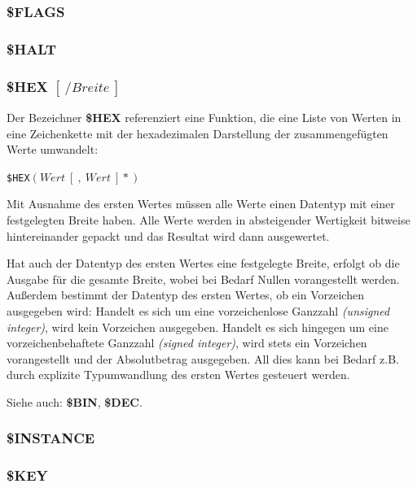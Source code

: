 \documentclass{scrartcl}
\begin{document}
\subsubsection{\$FLAGS}

\subsubsection{\$HALT}

\subsubsection{\$HEX $[~/Breite~]$}

\noindent Der Bezeichner \textbf{\$HEX} referenziert eine Funktion, die eine Liste von Werten in eine Zeichenkette mit der hexadezimalen Darstellung der zusammengefügten Werte umwandelt:

\vspace{10pt}
\texttt{\$HEX$(Wert~[~,~Wert~]*)$}

\vspace{10pt}
\noindent Mit Ausnahme des ersten Wertes müssen alle Werte einen Datentyp mit einer festgelegten Breite haben. Alle Werte werden in absteigender Wertigkeit bitweise hintereinander gepackt und das Resultat wird dann ausgewertet.

\vspace{10pt}
\noindent Hat auch der Datentyp des ersten Wertes eine festgelegte Breite, erfolgt ob die Ausgabe für die gesamte Breite, wobei bei Bedarf Nullen vorangestellt werden. Außerdem bestimmt der Datentyp des ersten Wertes, ob ein Vorzeichen ausgegeben wird: Handelt es sich um eine vorzeichenlose Ganzzahl \textit{(unsigned integer)}, wird kein Vorzeichen ausgegeben. Handelt es sich hingegen um eine vorzeichenbehaftete Ganzzahl \textit{(signed integer)}, wird stets ein Vorzeichen vorangestellt und der Absolutbetrag ausgegeben. All dies kann bei Bedarf z.B. durch explizite Typumwandlung des ersten Wertes gesteuert werden.

\vspace{10pt}
\noindent Siehe auch: \textbf{\$BIN}, \textbf{\$DEC}.

\subsubsection{\$INSTANCE}

\subsubsection{\$KEY}
\end{document}
